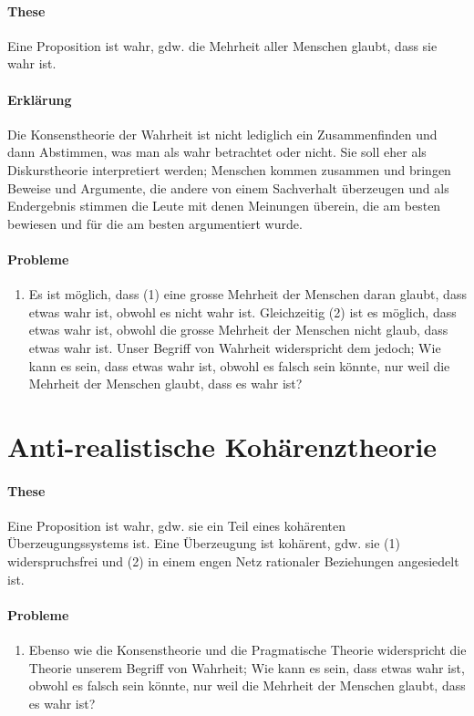 \documentclass[../main.tex]{subfiles}
\begin{document}
\paragraph{These} Eine Proposition ist wahr, gdw. die Mehrheit aller Menschen glaubt, dass sie wahr ist.
\paragraph{Erklärung} Die Konsenstheorie der Wahrheit ist nicht lediglich ein Zusammenfinden und dann Abstimmen, was man als wahr betrachtet oder nicht. Sie soll eher als Diskurstheorie interpretiert werden; Menschen kommen zusammen und bringen Beweise und Argumente, die andere von einem Sachverhalt überzeugen und als Endergebnis stimmen die Leute mit denen Meinungen überein, die am besten bewiesen und für die am besten argumentiert wurde.
\paragraph{Probleme} 
\begin{enumerate}
	\item Es ist möglich, dass (1) eine grosse Mehrheit der Menschen daran glaubt, dass etwas wahr ist, obwohl es nicht wahr ist. Gleichzeitig (2) ist es möglich, dass etwas wahr ist, obwohl die grosse Mehrheit der Menschen nicht glaub, dass etwas wahr ist. Unser Begriff von Wahrheit widerspricht dem jedoch; Wie kann es sein, dass etwas wahr ist, obwohl es falsch sein könnte, nur weil die Mehrheit der Menschen glaubt, dass es wahr ist?
\end{enumerate}

\section{Anti-realistische Kohärenztheorie}
\paragraph{These} Eine Proposition ist wahr, gdw. sie ein Teil eines kohärenten Überzeugungssystems ist. Eine Überzeugung ist kohärent, gdw. sie (1) widerspruchsfrei und (2) in einem engen Netz rationaler Beziehungen angesiedelt ist.
\paragraph{Probleme}
\begin{enumerate}
	\item Ebenso wie die Konsenstheorie und die Pragmatische Theorie widerspricht die Theorie unserem Begriff von Wahrheit; Wie kann es sein, dass etwas wahr ist, obwohl es falsch sein könnte, nur weil die Mehrheit der Menschen glaubt, dass es wahr ist?
\end{enumerate}
\end{document}
